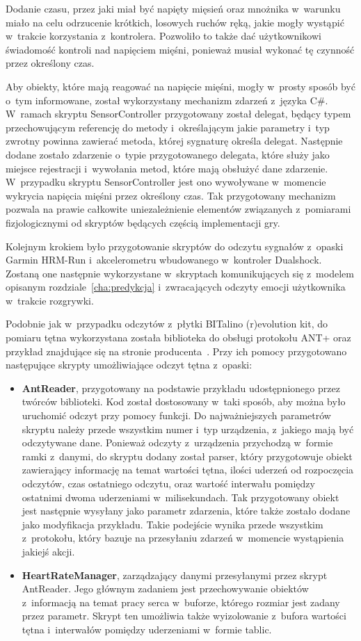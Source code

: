 Dodanie czasu, przez jaki miał być napięty mięsień oraz mnożnika w~warunku miało na celu odrzucenie krótkich, losowych ruchów ręką, jakie mogły wystąpić w~trakcie korzystania z~kontrolera. Pozwoliło to także dać użytkownikowi świadomość kontroli nad napięciem mięśni, ponieważ musiał wykonać tę czynność przez określony czas.

Aby obiekty, które mają reagować na napięcie mięśni, mogły w~prosty sposób być o~tym informowane, został wykorzystany mechanizm zdarzeń z~języka C\#. W~ramach skryptu SensorController przygotowany został delegat, będący typem przechowującym referencję do metody i~określającym jakie parametry i~typ zwrotny powinna zawierać metoda, której sygnaturę określa delegat. Następnie dodane zostało zdarzenie o~typie przygotowanego delegata, które służy jako miejsce rejestracji i~wywołania metod, które mają obsłużyć dane zdarzenie. W~przypadku skryptu SensorController jest ono wywoływane w~momencie wykrycia napięcia mięśni przez określony czas. Tak przygotowany mechanizm pozwala na prawie całkowite uniezależnienie elementów związanych z~pomiarami fizjologicznymi od skryptów będących częścią implementacji gry.

Kolejnym krokiem było przygotowanie skryptów do odczytu sygnałów z~opaski Garmin HRM-Run i~akcelerometru wbudowanego w~kontroler Dualshock. Zostaną one następnie wykorzystane w~skryptach komunikujących się z~modelem opisanym rozdziale~\ref{cha:predykcja} i~zwracających odczyty emocji użytkownika w~trakcie rozgrywki.

Podobnie jak w~przypadku odczytów z~płytki BITalino (r)evolution kit, do pomiaru tętna wykorzystana została biblioteka do obsługi protokołu ANT+ oraz przykład znajdujące się na stronie producenta~\cite{ant_sdk}. Przy ich pomocy przygotowano następujące skrypty umożliwiające odczyt tętna z~opaski:
\begin{itemize}
	\item \textbf{AntReader}, przygotowany na podstawie przykładu udostępnionego przez twórców biblioteki. Kod został dostosowany w~taki sposób, aby można było uruchomić odczyt przy pomocy funkcji. Do najważniejszych parametrów skryptu należy przede wszystkim numer i~typ urządzenia, z~jakiego mają być odczytywane dane. Ponieważ odczyty z~urządzenia przychodzą w~formie ramki z~danymi, do skryptu dodany został parser, który przygotowuje obiekt zawierający informację na temat wartości tętna, ilości uderzeń od rozpoczęcia odczytów, czas ostatniego odczytu, oraz wartość interwału pomiędzy ostatnimi dwoma uderzeniami w~milisekundach. Tak przygotowany obiekt jest następnie wysyłany jako parametr zdarzenia, które także zostało dodane jako modyfikacja przykładu. Takie podejście wynika przede wszystkim z~protokołu, który bazuje na przesyłaniu zdarzeń w~momencie wystąpienia jakiejś akcji.
	\item \textbf{HeartRateManager}, zarządzający danymi przesyłanymi przez skrypt AntReader. Jego głównym zadaniem jest przechowywanie obiektów z~informacją na temat pracy serca w~buforze, którego rozmiar jest zadany przez parametr. Skrypt ten umożliwia także wyizolowanie z~bufora wartości tętna i~interwałów pomiędzy uderzeniami w~formie tablic.
\end{itemize}

